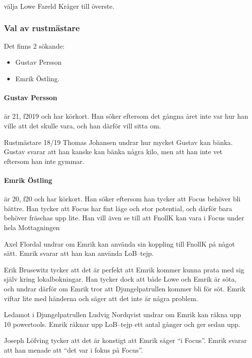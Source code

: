 \documentclass[hidelinks]{sektionsmote}
\begin{document}
\begin{beslut}
  \item välja Lowe Fareld Kråger till överste.
\end{beslut}

\subsubsection{Val av rustmästare}
Det finns 2 sökande:
\begin{itemize}
    \item Gustav Persson
    \item Emrik Östling.
\end{itemize}

\paragraph{Gustav Persson} är 21, f2019 och har körkort.
Han söker eftersom det gångna året inte var hur han ville att det skulle vara, och han därför vill sitta om.

Rustmästare 18/19 Thomas Johansen undrar hur mycket Gustav kan bänka.
Gustav svarar att han kanske kan bänka några kilo, men att han inte vet eftersom han inte gymmar.

\paragraph{Emrik Östling} är 20, f20 och har körkort.
Han söker eftersom han tycker att Focus behöver bli bättre.
Han tycker att Focus har fint läge och stor potential, och därför bara behöver fräschas upp lite.
Han vill även se till att FnollK kan vara i Focus under hela Mottagningen

Axel Flordal undrar om Emrik kan använda sin koppling till FnollK på något sätt.
Emrik svarar att han kan använda LoB--tejp.

Erik Brusewitz tycker att det är perfekt att Emrik kommer kunna prata med sig själv kring lokalbokningar.
Han tycker dock att både Lowe och Emrik är söta, och undrar därför om Emrik tror att Djungelpatrullen kommer bli för söt.
Emrik viftar lite med händerna och säger att det inte är några problem.

Ledamot i Djungelpatrullen Ludvig Nordqvist undrar om Emrik kan räkna upp 10 powertools.
Emrik räknar upp LoB--tejp ett antal gånger och ger sedan upp.

Joseph Löfving tycker att det är konstigt att Emrik säger \enquote{i Focus}.
Emrik svarar att han menade att \enquote{det var i fokus på Focus}.
\end{document}
